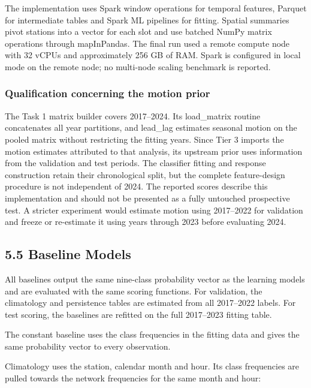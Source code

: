 \documentclass[11pt,a4paper]{article}
\begin{document}
The implementation uses Spark window operations for temporal features, Parquet for intermediate tables and Spark ML pipelines for fitting. Spatial summaries pivot stations into a vector for each slot and use batched NumPy matrix operations through mapInPandas. The final run used a remote compute node with 32 vCPUs and approximately 256 GB of RAM. Spark is configured in local mode on the remote node; no multi-node scaling benchmark is reported. 


\subsubsection*{Qualification concerning the motion prior}
{}


The Task 1 matrix builder covers 2017–2024. Its load\_matrix routine concatenates all year partitions, and lead\_lag estimates seasonal motion on the pooled matrix without restricting the fitting years. Since Tier 3 imports the motion estimates attributed to that analysis, its upstream prior uses information from the validation and test periods. The classifier fitting and response construction retain their chronological split, but the complete feature-design procedure is not independent of 2024. The reported scores describe this implementation and should not be presented as a fully untouched prospective test. A stricter experiment would estimate motion using 2017–2022 for validation and freeze or re-estimate it using years through 2023 before evaluating 2024.


\subsection*{5.5 Baseline Models}
{}


All baselines output the same nine-class probability vector as the learning models and are evaluated with the same scoring functions. For validation, the climatology and persistence tables are estimated from all 2017–2022 labels. For test scoring, the baselines are refitted on the full 2017–2023 fitting table.


The constant baseline uses the class frequencies in the fitting data and gives the same probability vector to every observation.


Climatology uses the station, calendar month and hour. Its class frequencies are pulled towards the network frequencies for the same month and hour:
\end{document}
